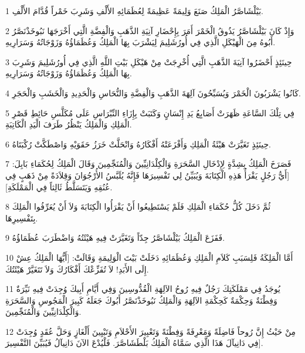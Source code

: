 \par 1 بَيْلْشَاصَّرُ الْمَلِكُ صَنَعَ وَلِيمَةً عَظِيمَةً لِعُظَمَائِهِ الأَلْفِ وَشَرِبَ خَمْراً قُدَّامَ الأَلْفِ.
\par 2 وَإِذْ كَانَ بَيْلْشَاصَّرُ يَذُوقُ الْخَمْرَ أَمَرَ بِإِحْضَارِ آنِيَةِ الذَّهَبِ وَالْفِضَّةِ الَّتِي أَخْرَجَهَا نَبُوخَذْنَصَّرُ أَبُوهُ مِنَ الْهَيْكَلِ الَّذِي فِي أُورُشَلِيمَ لِيَشْرَبَ بِهَا الْمَلِكُ وَعُظَمَاؤُهُ وَزَوْجَاتُهُ وَسَرَارِيهِ.
\par 3 حِينَئِذٍ أَحْضَرُوا آنِيَةَ الذَّهَبِ الَّتِي أُخْرِجَتْ مِنْ هَيْكَلِ بَيْتِ اللَّهِ الَّذِي فِي أُورُشَلِيمَ وَشَرِبَ بِهَا الْمَلِكُ وَعُظَمَاؤُهُ وَزَوْجَاتُهُ وَسَرَارِيهِ.
\par 4 كَانُوا يَشْرَبُونَ الْخَمْرَ وَيُسَبِّحُونَ آلِهَةَ الذَّهَبِ وَالْفِضَّةِ وَالنُّحَاسِ وَالْحَدِيدِ وَالْخَشَبِ وَالْحَجَرِ.
\par 5 فِي تِلْكَ السَّاعَةِ ظَهَرَتْ أَصَابِعُ يَدِ إِنْسَانٍ وَكَتَبَتْ بِإِزَاءِ النِّبْرَاسِ عَلَى مُكَلَّسِ حَائِطِ قَصْرِ الْمَلِكِ وَالْمَلِكُ يَنْظُرُ طَرَفَ الْيَدِ الْكَاتِبَةِ.
\par 6 حِينَئِذٍ تَغَيَّرَتْ هَيْئَةُ الْمَلِكِ وَأَفْزَعَتْهُ أَفْكَارُهُ وَانْحَلَّتْ خَرَزُ حَقَوَيْهِ وَاصْطَكَّتْ رُكْبَتَاهُ.
\par 7 فَصَرَخَ الْمَلِكُ بِشِدَّةٍ لِإِدْخَالِ السَّحَرَةِ وَالْكِلْدَانِيِّينَ وَالْمُنَجِّمِينَ وَقَالَ الْمَلِكُ لِحُكَمَاءِ بَابِلَ: [أَيُّ رَجُلٍ يَقْرَأُ هَذِهِ الْكِتَابَةَ وَيُبَيِّنُ لِي تَفْسِيرَهَا فَإِنَّهُ يُلَبَّسُ الأُرْجُوَانَ وَقِلاَدَةً مِنْ ذَهَبٍ فِي عُنُقِهِ وَيَتَسَلَّطُ ثَالِثاً فِي الْمَمْلَكَةِ].
\par 8 ثُمَّ دَخَلَ كُلُّ حُكَمَاءِ الْمَلِكِ فَلَمْ يَسْتَطِيعُوا أَنْ يَقْرَأُوا الْكِتَابَةَ وَلاَ أَنْ يُعَرِّفُوا الْمَلِكَ بِتَفْسِيرِهَا.
\par 9 فَفَزَعَ الْمَلِكُ بَيْلْشَاصَّرُ جِدّاً وَتَغَيَّرَتْ فِيهِ هَيْئَتُهُ وَاضْطَرَبَ عُظَمَاؤُهُ.
\par 10 أَمَّا الْمَلِكَةُ فَلِسَبَبِ كَلاَمِ الْمَلِكِ وَعُظَمَائِهِ دَخَلَتْ بَيْتَ الْوَلِيمَةِ وَقَالَتْ: [أَيُّهَا الْمَلِكُ عِشْ إِلَى الأَبَدِ! لاَ تُفَزِّعْكَ أَفْكَارُكَ وَلاَ تَتَغَيَّرْ هَيْئَتُكَ.
\par 11 يُوجَدُ فِي مَمْلَكَتِكَ رَجُلٌ فِيهِ رُوحُ الآلِهَةِ الْقُدُّوسِينَ وَفِي أَيَّامِ أَبِيكَ وُجِدَتْ فِيهِ نَيِّرَةٌ وَفِطْنَةٌ وَحِكْمَةٌ كَحِكْمَةِ الآلِهَةِ وَالْمَلِكُ نَبُوخَذْنَصَّرُ أَبُوكَ جَعَلَهُ كَبِيرَ الْمَجُوسِ وَالسَّحَرَةِ وَالْكِلْدَانِيِّينَ وَالْمُنَجِّمِينَ.
\par 12 مِنْ حَيْثُ إِنَّ رُوحاً فَاضِلَةً وَمَعْرِفَةً وَفِطْنَةً وَتَعْبِيرَ الأَحْلاَمِ وَتَبْيِينَ أَلْغَازٍ وَحَلَّ عُقَدٍ وُجِدَتْ فِي دَانِيآلَ هَذَا الَّذِي سَمَّاهُ الْمَلِكُ بَلْطَشَاصَّرَ. فَلْيُدْعَ الآنَ دَانِيآلُ فَيُبَيِّنَ التَّفْسِيرَ].
